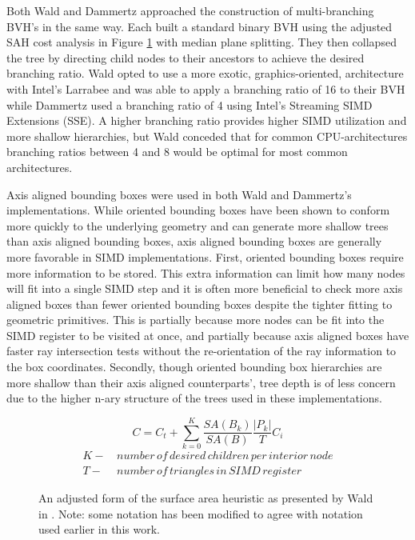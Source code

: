 Both Wald and Dammertz approached the construction of multi-branching BVH's in
the same way. Each built a standard binary BVH using the adjusted SAH cost
analysis in Figure \ref{adjusted_SAH} with median plane splitting. They then
collapsed the tree by directing child nodes to their ancestors to achieve the
desired branching ratio. Wald opted to use a more exotic, graphics-oriented,
architecture with Intel's Larrabee and was able to apply a branching ratio of 16
to their BVH while Dammertz used a branching ratio of 4 using Intel's Streaming
SIMD Extensions (SSE). A higher branching ratio provides higher SIMD utilization
and more shallow hierarchies, but Wald conceded that for common CPU-architectures
branching ratios between 4 and 8 would be optimal for most common architectures.

Axis aligned bounding boxes were used in both Wald and Dammertz's
implementations. While oriented bounding boxes have been shown to conform more
quickly to the underlying geometry and can generate more shallow trees than axis
aligned bounding boxes, axis aligned bounding boxes are generally more favorable
in SIMD implementations. First, oriented bounding boxes require more
information to be stored. This extra information can limit how many nodes will fit into a single
SIMD step and it is often more beneficial to check more axis aligned boxes than
fewer oriented bounding boxes despite the tighter fitting to geometric
primitives. This is partially because more nodes can be fit into the SIMD
register to be visited at once, and partially because axis aligned boxes have
faster ray intersection tests without the re-orientation of the ray information
to the box coordinates. Secondly, though oriented bounding box hierarchies are
more shallow than their axis aligned counterparts', tree depth is of less
concern due to the higher n-ary structure of the trees used in these
implementations.

\begin{figure}[H]
  \begin{equation}
    C = C_t + \sum_{k=0}^{K} \frac{SA(B_k)}{SA(B)}\frac{|P_k|}{T}C_i
  \end{equation}
  \begin{align*}
    K - & \, number \, of \, desired \, children \, per \, interior \, node \\
    T - & \, number \, of \, triangles \, in \, SIMD \, register
  \end{align*}
  \caption{An adjusted form of the surface area heuristic as presented by Wald in \cite{Wald_2008}. Note: some notation has been modified to agree with notation used earlier in this work.}
  \label{adjusted_SAH}
\end{figure}

